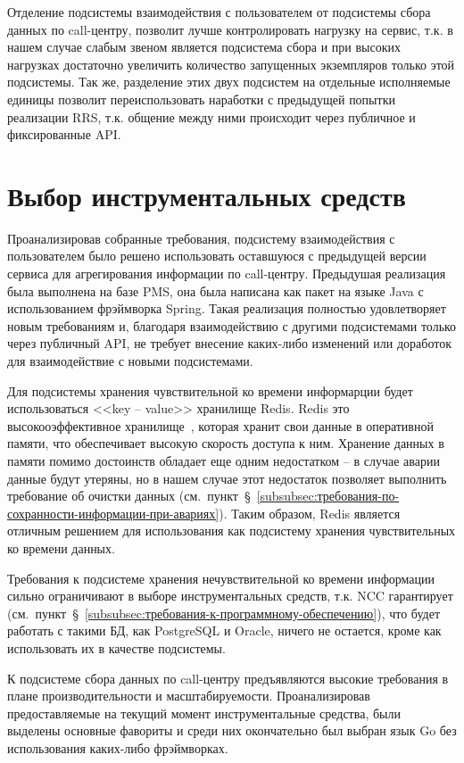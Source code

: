 Отделение подсистемы взаимодействия с пользователем от подсистемы сбора данных по call-центру,
позволит лучше контролировать нагрузку на сервис,
т.к. в нашем случае слабым звеном является подсистема сбора
и при высоких нагрузках достаточно увеличить количество запущенных экземпляров только этой подсистемы.
Так же, разделение этих двух подсистем на отдельные
исполняемые единицы позволит переиспользовать наработки с предыдущей попытки реализации RRS\@,
т.к. общение между ними происходит через публичное и фиксированные API\@.

\section{Выбор инструментальных средств}

Проанализировав собранные требования, подсистему взаимодействия с пользователем было решено
использовать оставшуюся с предыдущей версии сервиса для агрегирования информации по call-центру.
Предыдушая реализация была выполнена на базе PMS, она была написана как пакет на языке Java с
использованием фрэймворка Spring.
Такая реализация полностью удовлетворяет новым требованиям
и, благодаря взаимодействию с другими подсистемами только через публичный API,
не требует внесение каких-либо изменений или доработок для взаимодействие с новыми подсистемами.

Для подсистемы хранения чувствительной ко времени информарции будет использоваться
<<key -- value>> хранилище Redis.
Redis это высокооэффективное хранилище~\cite{HowfastisRedis},
которая хранит свои данные в оперативной памяти,
что обеспечивает высокую скорость доступа к ним.
Хранение данных в памяти помимо достоинств обладает еще одним недостатком --
в случае аварии данные будут утеряны,
но в нашем случае этот недостаток позволяет выполнить требование об очистки данных (см.~пункт~\S~\ref{subsubsec:требования-по-сохранности-информации-при-авариях}).
Таким образом, Redis является отличным решением для использования как подсистему хранения
чувствительных ко времени данных.

Требования к подсистеме хранения нечувствительной ко времени информации сильно ограничивают
в выборе инструментальных средств, т.к. NCC гарантирует (см.~пункт~\S~\ref{subsubsec:требования-к-программному-обеспечению}),
что будет работать с такими БД, как PostgreSQL и Oracle,
ничего не остается, кроме как использовать их в качестве подсистемы.

К подсистеме сбора данных по call-центру предъявляются
высокие требования в плане производительности и масштабируемости.
Проанализировав предоставляемые на текущий момент инструментальные средства,
были выделены основные фавориты и среди них окончательно был выбран язык Go без использования
каких-либо фрэймворках.

